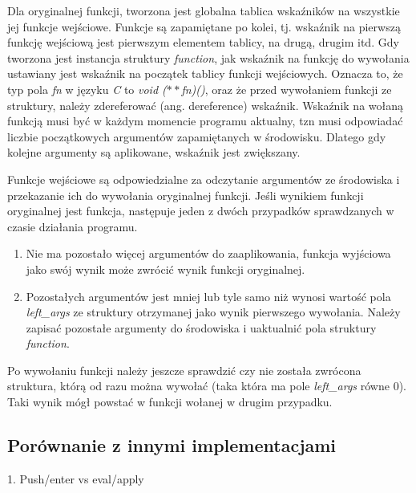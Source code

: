 \documentclass[declaration,shortabstract]{iithesis}
\begin{document}
Dla oryginalnej funkcji, tworzona jest globalna tablica wskaźników na wszystkie 
jej funkcje wejściowe. Funkcje są zapamiętane po kolei, tj. 
wskaźnik na pierwszą funkcję wejściową jest pierwszym elementem tablicy, na 
drugą, drugim itd. 
Gdy tworzona jest instancja struktury \textit{function}, jak wskaźnik na 
funkcję do wywołania ustawiany jest wskaźnik na początek tablicy funkcji 
wejściowych. Oznacza to, że typ pola \textit{fn} w języku \textit{C} to 
\textit{void ($\ast\ast$fn)()}, oraz że przed wywołaniem funkcji ze struktury,
należy zdereferować (ang. dereference) wskaźnik. Wskaźnik na wołaną funkcją 
musi być w każdym momencie programu aktualny, tzn musi odpowiadać liczbie 
początkowych argumentów zapamiętanych w środowisku. Dlatego gdy kolejne 
argumenty są aplikowane, wskaźnik jest zwiększany. 


Funkcje wejściowe są odpowiedzialne za odczytanie argumentów ze środowiska i 
przekazanie ich do wywołania oryginalnej funkcji. Jeśli wynikiem funkcji 
oryginalnej jest funkcja, następuje jeden z dwóch przypadków sprawdzanych w
czasie działania programu.

\begin{enumerate}
  \item Nie ma pozostało więcej argumentów do zaaplikowania, 
  funkcja wyjściowa jako swój wynik może zwrócić wynik funkcji oryginalnej.
  \item Pozostałych argumentów jest mniej lub tyle samo niż wynosi 
  wartość pola \textit{left\_args} ze struktury otrzymanej jako wynik 
  pierwszego wywołania.
  Należy zapisać pozostałe argumenty do środowiska i uaktualnić pola struktury 
  \textit{function}.
\end{enumerate}

Po wywołaniu funkcji należy jeszcze sprawdzić czy nie została zwrócona 
struktura, którą od razu można wywołać (taka która ma pole \textit{left\_args} 
równe $0$). Taki wynik mógł powstać w funkcji wołanej w drugim przypadku.

\subsection{Porównanie z innymi implementacjami}

1. Push/enter vs eval/apply
\end{document}
